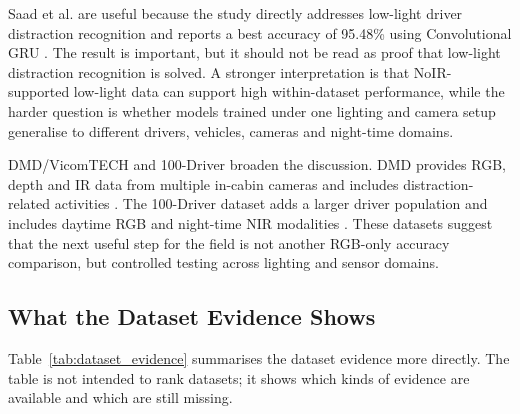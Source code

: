 \documentclass[11pt,a4paper]{article}
\let\oldsubsection\subsection
\renewcommand{\subsection}{\Needspace{6\baselineskip}\oldsubsection}
\begin{document}
Saad et al. are useful because the study directly addresses low-light driver distraction recognition and reports a best accuracy of 95.48\% using Convolutional GRU \parencite{saad2020lowlight}. The result is important, but it should not be read as proof that low-light distraction recognition is solved. A stronger interpretation is that NoIR-supported low-light data can support high within-dataset performance, while the harder question is whether models trained under one lighting and camera setup generalise to different drivers, vehicles, cameras and night-time domains.

DMD/VicomTECH and 100-Driver broaden the discussion. DMD provides RGB, depth and IR data from multiple in-cabin cameras and includes distraction-related activities \parencite{ortega2020dmd}. The 100-Driver dataset adds a larger driver population and includes daytime RGB and night-time NIR modalities \parencite{wang2023hundreddriver}. These datasets suggest that the next useful step for the field is not another RGB-only accuracy comparison, but controlled testing across lighting and sensor domains.

\subsection{What the Dataset Evidence Shows}

Table~\ref{tab:dataset_evidence} summarises the dataset evidence more directly. The table is not intended to rank datasets; it shows which kinds of evidence are available and which are still missing.
\end{document}
